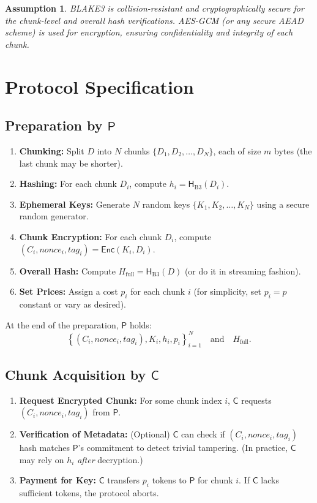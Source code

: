 \documentclass[11pt]{article}
\newtheorem{assumption}{Assumption}
\begin{document}
\begin{assumption}
BLAKE3 is collision-resistant and cryptographically secure for the chunk-level and overall hash verifications. 
AES-GCM (or any secure AEAD scheme) is used for encryption, ensuring confidentiality and integrity of each chunk.
\end{assumption}

\section{Protocol Specification}

\subsection{Preparation by $\mathsf{P}$}
\begin{enumerate}[{\bf P1.}]
    \item \textbf{Chunking:} Split $D$ into $N$ chunks $\{D_1, D_2, \ldots, D_N\}$, each of size $m$ bytes (the last chunk may be shorter).
    \item \textbf{Hashing:} For each chunk $D_i$, compute $h_i = \mathsf{H}_{\mathrm{B3}}(D_i)$. 
    \item \textbf{Ephemeral Keys:} Generate $N$ random keys $\{K_1, K_2, \ldots, K_N\}$ using a secure random generator.
    \item \textbf{Chunk Encryption:} For each chunk $D_i$, compute $(C_i, \mathit{nonce}_i, \mathit{tag}_i) = \mathsf{Enc}(K_i, D_i)$.
    \item \textbf{Overall Hash:} Compute $H_{\mathrm{full}} = \mathsf{H}_{\mathrm{B3}}(D)$ (or do it in streaming fashion).
    \item \textbf{Set Prices:} Assign a cost $p_i$ for each chunk $i$ (for simplicity, set $p_i = p$ constant or vary as desired).
\end{enumerate}

At the end of the preparation, $\mathsf{P}$ holds:
\[
   \left\{ (C_i, \mathit{nonce}_i, \mathit{tag}_i), K_i, h_i, p_i \right\}_{i=1}^N 
   \quad \text{and} \quad H_{\mathrm{full}}.
\]

\subsection{Chunk Acquisition by $\mathsf{C}$}
\begin{enumerate}[{\bf C1.}]
    \item \textbf{Request Encrypted Chunk:} For some chunk index $i$, $\mathsf{C}$ requests $(C_i, \mathit{nonce}_i, \mathit{tag}_i)$ from $\mathsf{P}$.
    \item \textbf{Verification of Metadata:} (Optional) $\mathsf{C}$ can check if $(C_i, \mathit{nonce}_i, \mathit{tag}_i)$ hash matches $\mathsf{P}$'s commitment to detect trivial tampering. 
    (In practice, $\mathsf{C}$ may rely on $h_i$ \emph{after} decryption.)
    \item \textbf{Payment for Key:} $\mathsf{C}$ transfers $p_i$ tokens to $\mathsf{P}$ for chunk $i$. 
    If $\mathsf{C}$ lacks sufficient tokens, the protocol aborts.
\end{enumerate}
\end{document}
